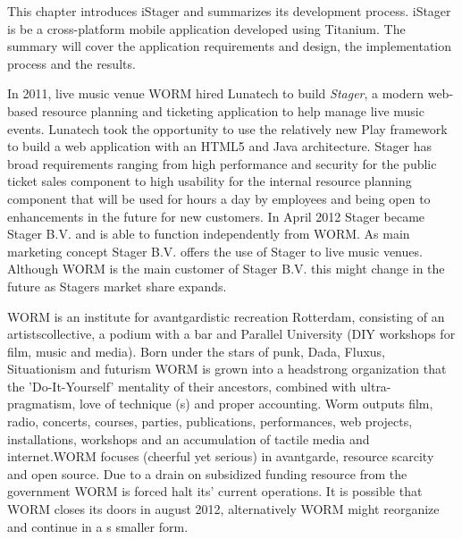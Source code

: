 This chapter introduces iStager and summarizes its development process. iStager is be a cross-platform mobile application developed using Titanium. The summary will cover the application requirements and design, the implementation process and the results. 






In 2011, live music venue WORM hired Lunatech to build \emph{Stager}, a modern web-based resource planning and ticketing application to help manage live music events. Lunatech took the opportunity to use the relatively new Play framework to build a web application with an HTML5 and Java architecture. Stager has broad requirements ranging from high performance and security for the public ticket sales component to high usability for the internal resource planning component that will be used for hours a day by employees and being open to enhancements in the future for new customers. \cite{Lunatech2011} In April 2012 Stager became Stager B.V. and is able to function independently from WORM. As main marketing concept Stager B.V. offers the use of Stager  to live music venues. Although WORM is the main customer of Stager B.V. this might change in the future as Stagers market share expands. 

WORM is an institute for avantgardistic recreation Rotterdam, consisting of an artistscollective, a podium with a bar and Parallel University (DIY workshops for film, music and media). Born under the stars of punk, Dada, Fluxus, Situationism and futurism WORM is grown into a headstrong organization that the 'Do-It-Yourself' mentality of their ancestors, combined with ultra-pragmatism, love of technique (s) and proper accounting. Worm outputs film, radio, concerts, courses, parties, publications, performances, web projects, installations, workshops and an accumulation of tactile media and internet.WORM focuses (cheerful yet serious) in avantgarde, resource scarcity and open source. \cite{WORM2012} Due to a drain on subsidized funding resource from the government WORM is forced halt its' current operations. It is possible that WORM closes its doors in august 2012, alternatively WORM might reorganize and continue in a s smaller form.

